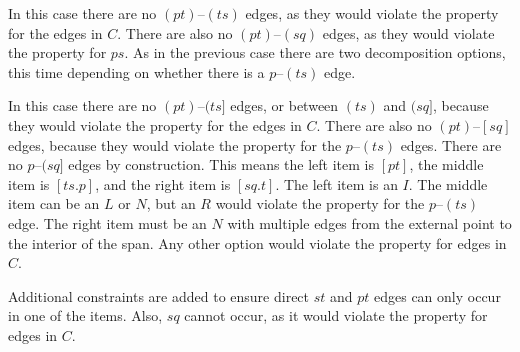 In this case there are no $(pt)$--$(ts)$ edges, as they would violate the \oneEC property for the edges in $C$.
There are also no $(pt)$--$(sq)$ edges, as they would violate the \oneEC property for $ps$.
As in the previous case there are two decomposition options, this time depending on whether there is a $p$--$(ts)$ edge.

\begin{center}
\end{center}

In this case there are no $(pt)$--$(ts]$ edges, or between $(ts)$ and $(sq]$, because they would violate the \oneEC property for the edges in $C$.
There are also no $(pt)$--$[sq]$ edges, because they would violate the \oneEC property for the $p$--$(ts)$ edges.
There are no $p$--$(sq]$ edges by construction.
This means the left item is $[pt]$, the middle item is $[ts.p]$, and the right item is $[sq.t]$.
The left item is an $I$.
The middle item can be an $L$ or $N$, but an $R$ would violate the \oneEC property for the $p$--$(ts)$ edge.
The right item must be an $N$ with multiple edges from the external point to the interior of the span.
Any other option would violate the \oneEC property for edges in $C$.

Additional constraints are added to ensure direct $st$ and $pt$ edges can only occur in one of the items.
Also, $sq$ cannot occur, as it would violate the \oneEC property for edges in $C$.


